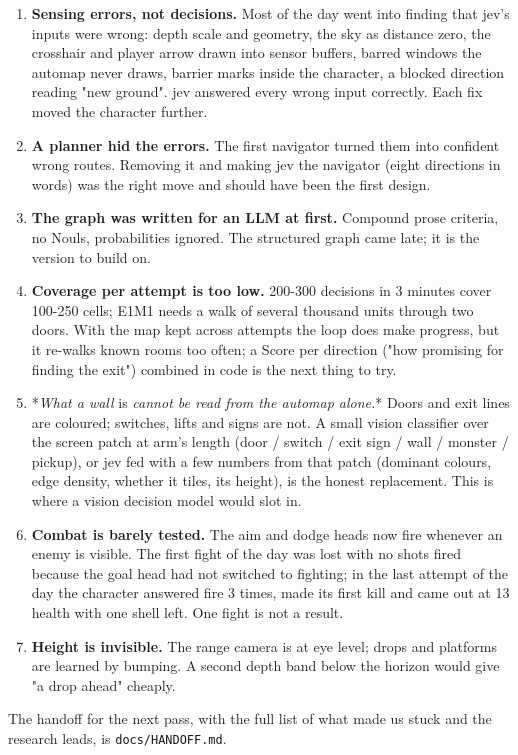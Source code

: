 \documentclass[11pt]{article}
\begin{document}
\begin{enumerate}
  \item \textbf{Sensing errors, not decisions.} Most of the day went into finding that jev's inputs were wrong: depth scale and geometry, the sky as distance zero, the crosshair and player arrow drawn into sensor buffers, barred windows the automap never draws, barrier marks inside the character, a blocked direction reading "new ground". jev answered every wrong input correctly. Each fix moved the character further.
  \item \textbf{A planner hid the errors.} The first navigator turned them into confident wrong routes. Removing it and making jev the navigator (eight directions in words) was the right move and should have been the first design.
  \item \textbf{The graph was written for an LLM at first.} Compound prose criteria, no Nouls, probabilities ignored. The structured graph came late; it is the version to build on.
  \item \textbf{Coverage per attempt is too low.} 200-300 decisions in 3 minutes cover 100-250 cells; E1M1 needs a walk of several thousand units through two doors. With the map kept across attempts the loop does make progress, but it re-walks known rooms too often; a Score per direction ("how promising for finding the exit") combined in code is the next thing to try.
  \item *\emph{What a wall }is\emph{ cannot be read from the automap alone.}* Doors and exit lines are coloured; switches, lifts and signs are not. A small vision classifier over the screen patch at arm's length (door / switch / exit sign / wall / monster / pickup), or jev fed with a few numbers from that patch (dominant colours, edge density, whether it tiles, its height), is the honest replacement. This is where a vision decision model would slot in.
  \item \textbf{Combat is barely tested.} The aim and dodge heads now fire whenever an enemy is visible. The first fight of the day was lost with no shots fired because the goal head had not switched to fighting; in the last attempt of the day the character answered fire 3 times, made its first kill and came out at 13 health with one shell left. One fight is not a result.
  \item \textbf{Height is invisible.} The range camera is at eye level; drops and platforms are learned by bumping. A second depth band below the horizon would give "a drop ahead" cheaply.
\end{enumerate}
The handoff for the next pass, with the full list of what made us stuck and the research leads, is \texttt{docs/HANDOFF.md}.
\end{document}
